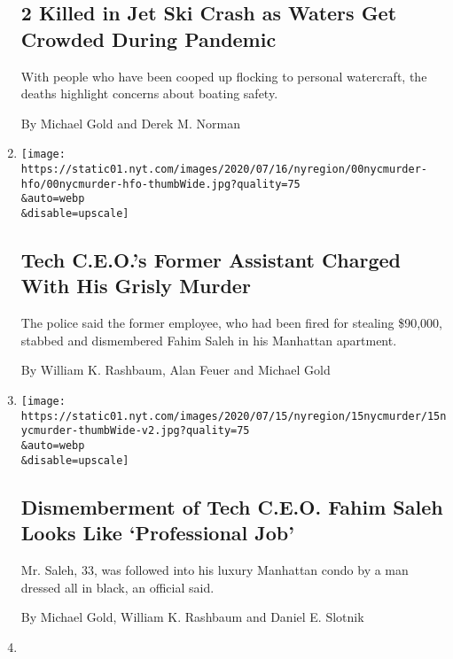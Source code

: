 \begin{enumerate}
{  \subsection{2 Killed in Jet Ski Crash as Waters Get Crowded During
  Pandemic}\label{2-killed-in-jet-ski-crash-as-waters-get-crowded-during-pandemic}}

  With people who have been cooped up flocking to personal watercraft,
  the deaths highlight concerns about boating safety.

  By Michael Gold and Derek M. Norman
\item
  \href{/2020/07/17/nyregion/fahim-saleh-suspect-tyrese-devon-haspil.html}{}

  \texttt{[image: https://static01.nyt.com/images/2020/07/16/nyregion/00nycmurder-hfo/00nycmurder-hfo-thumbWide.jpg?quality=75\\\&auto=webp\\\&disable=upscale]}

  \hypertarget{tech-ceos-former-assistant-charged-with-his-grisly-murder}{%
  \subsection{Tech C.E.O.'s Former Assistant Charged With His Grisly
  Murder}\label{tech-ceos-former-assistant-charged-with-his-grisly-murder}}

  The police said the former employee, who had been fired for stealing
  \$90,000, stabbed and dismembered Fahim Saleh in his Manhattan
  apartment.

  By William K. Rashbaum, Alan Feuer and Michael Gold
\item
  \href{/2020/07/15/nyregion/fahim-saleh-lower-east-side-murder.html}{}

  \texttt{[image: https://static01.nyt.com/images/2020/07/15/nyregion/15nycmurder/15nycmurder-thumbWide-v2.jpg?quality=75\\\&auto=webp\\\&disable=upscale]}

  \hypertarget{dismemberment-of-tech-ceo-fahim-saleh-looks-like-professional-job}{%
  \subsection{Dismemberment of Tech C.E.O. Fahim Saleh Looks Like
  `Professional
  Job'}\label{dismemberment-of-tech-ceo-fahim-saleh-looks-like-professional-job}}

  Mr. Saleh, 33, was followed into his luxury Manhattan condo by a man
  dressed all in black, an official said.

  By Michael Gold, William K. Rashbaum and Daniel E. Slotnik
\item
  \href{/2020/07/13/nyregion/Davell-Gardner-brooklyn-shooting.html}{}


\end{enumerate}
